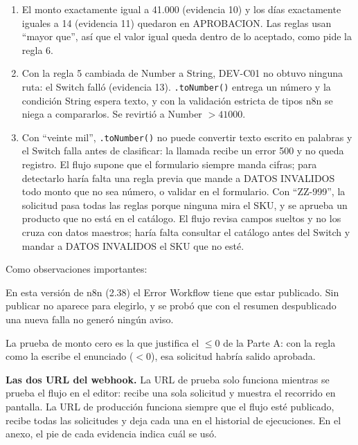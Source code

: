 \documentclass{article}
\begin{document}
\begin{enumerate}
\begin{center}
{\begin{minipage}{8.5cm}
Mensaje: cannot convert to number\\
Ejecución: 96 (modo webhook)
\end{minipage}}
\end{center}
Sin un Error Workflow, un flujo programado falla en silencio: nadie lo está mirando cuando corre
a las 23:55, así que el error queda anotado solo en el historial de ejecuciones de n8n y nadie
se entera hasta notar que el correo del resumen no llegó.
\item El monto exactamente igual a 41.000 (evidencia 10) y los días exactamente iguales a 14
(evidencia 11) quedaron en APROBACION. Las reglas usan ``mayor que'', así que el valor igual
queda dentro de lo aceptado, como pide la regla 6.
\item Con la regla 5 cambiada de Number a String, DEV-C01 no obtuvo ninguna ruta: el Switch
falló (evidencia 13). \texttt{.toNumber()} entrega un número y la condición String espera
texto, y con la validación estricta de tipos n8n se niega a compararlos. Se revirtió a Number
$> 41000$.
\item Con ``veinte mil'', \texttt{.toNumber()} no puede convertir texto escrito en palabras y el
Switch falla antes de clasificar: la llamada recibe un error 500 y no queda registro. El flujo
supone que el formulario siempre manda cifras; para detectarlo haría falta una regla previa que
mande a DATOS INVALIDOS todo monto que no sea número, o validar en el formulario. Con
``ZZ-999'', la solicitud pasa todas las reglas porque ninguna mira el SKU, y se aprueba un
producto que no está en el catálogo. El flujo revisa campos sueltos y no los cruza con datos
maestros; haría falta consultar el catálogo antes del Switch y mandar a DATOS INVALIDOS el SKU
que no esté.
\end{enumerate}

Como observaciones importantes:
\begin{compactitem}
\item En esta versión de n8n (2.38) el Error Workflow tiene que estar publicado. Sin publicar
no aparece para elegirlo, y se probó que con el resumen despublicado una nueva falla no generó
ningún aviso.
\item La prueba de monto cero es la que justifica el $\leq 0$ de la Parte A: con la regla
como la escribe el enunciado ($< 0$), esa solicitud habría salido aprobada.
\end{compactitem}

\textbf{Las dos URL del webhook.} La URL de prueba solo funciona mientras se prueba el flujo en
el editor: recibe una sola solicitud y muestra el recorrido en pantalla. La URL de producción
funciona siempre que el flujo esté publicado, recibe todas las solicitudes y deja cada una en el
historial de ejecuciones. En el anexo, el pie de cada evidencia indica cuál se usó.
\end{document}
